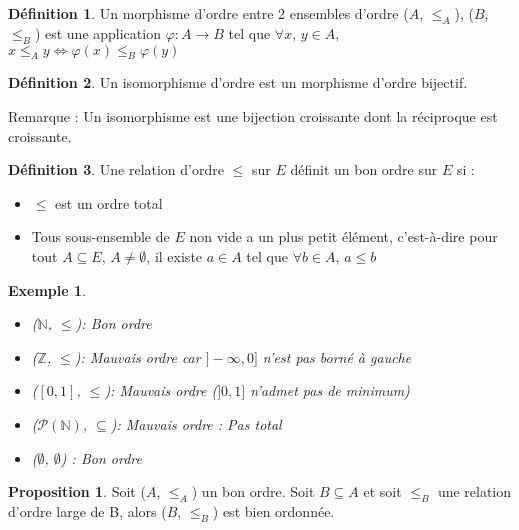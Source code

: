 \documentclass{article}
\theoremstyle{definition}
\newtheorem{definition}{Définition}
\theoremstyle{definition}
\newtheorem{prop}{Proposition}
\theoremstyle{definition}
\theoremstyle{plain}
\newtheorem{example}{Exemple}
\theoremstyle{theorem}
\theoremstyle{theorem}
\begin{document}
\begin{definition}

    Un morphisme d'ordre entre 2 ensembles d'ordre ($A$, $\leqslant_A$), ($B$, $\leqslant_B$) est une application $\varphi : A \to B$
    tel que $\forall x$, $y\in A$, $x \leqslant_A y \iff \varphi(x) \leqslant_B \varphi(y)$

\end{definition}

\begin{definition}

    Un isomorphisme d'ordre est un morphisme d'ordre bijectif.

    Remarque : Un isomorphisme est une bijection croissante dont la réciproque est croissante.

\end{definition}

\begin{definition}

    Une relation d'ordre $\leqslant$ sur $E$ définit un bon ordre sur $E$ si :
    \begin{itemize}
        \item $\leqslant$ est un ordre total
        \item Tous sous-ensemble de $E$ non vide a un plus petit élément, c'est-à-dire pour tout $A \subseteq E$, $A \neq \emptyset$, il existe
            $a \in A$ tel que $\forall b \in A$, $a \leqslant b$
    \end{itemize}

\end{definition}

\begin{example}
    \begin{itemize}
        \item ($\mathbb{N}$, $\leqslant$): Bon ordre
        \item ($\mathbb{Z}$, $\leqslant$): Mauvais ordre car $]-\infty, 0]$ n'est pas borné à gauche
        \item ($[0, 1]$, $\leqslant$): Mauvais ordre ($]0, 1]$ n'admet pas de minimum)
        \item ($\mathscr{P}(\mathbb{N})$, $\subseteq$): Mauvais ordre : Pas total
        \item ($\emptyset$, $\emptyset$) : Bon ordre
    \end{itemize} 
\end{example}

\begin{prop}
    Soit ($A$, $\leqslant_A$) un bon ordre. Soit $B \subseteq A$ et soit $\leqslant_B$ une relation d'ordre large de B, alors ($B$, $\leqslant_B$) est bien ordonnée.
\end{prop}
\end{document}
